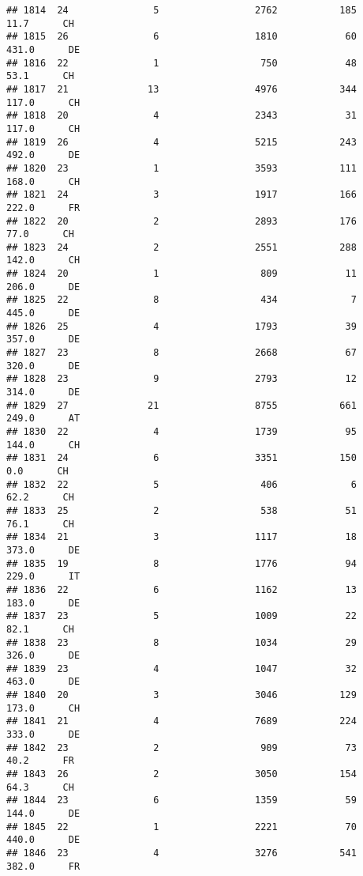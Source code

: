 \documentclass[
]{article}
\begin{document}
\begin{verbatim}
## 1814  24               5                 2762           185     11.7      CH
## 1815  26               6                 1810            60    431.0      DE
## 1816  22               1                  750            48     53.1      CH
## 1817  21              13                 4976           344    117.0      CH
## 1818  20               4                 2343            31    117.0      CH
## 1819  26               4                 5215           243    492.0      DE
## 1820  23               1                 3593           111    168.0      CH
## 1821  24               3                 1917           166    222.0      FR
## 1822  20               2                 2893           176     77.0      CH
## 1823  24               2                 2551           288    142.0      CH
## 1824  20               1                  809            11    206.0      DE
## 1825  22               8                  434             7    445.0      DE
## 1826  25               4                 1793            39    357.0      DE
## 1827  23               8                 2668            67    320.0      DE
## 1828  23               9                 2793            12    314.0      DE
## 1829  27              21                 8755           661    249.0      AT
## 1830  22               4                 1739            95    144.0      CH
## 1831  24               6                 3351           150      0.0      CH
## 1832  22               5                  406             6     62.2      CH
## 1833  25               2                  538            51     76.1      CH
## 1834  21               3                 1117            18    373.0      DE
## 1835  19               8                 1776            94    229.0      IT
## 1836  22               6                 1162            13    183.0      DE
## 1837  23               5                 1009            22     82.1      CH
## 1838  23               8                 1034            29    326.0      DE
## 1839  23               4                 1047            32    463.0      DE
## 1840  20               3                 3046           129    173.0      CH
## 1841  21               4                 7689           224    333.0      DE
## 1842  23               2                  909            73     40.2      FR
## 1843  26               2                 3050           154     64.3      CH
## 1844  23               6                 1359            59    144.0      DE
## 1845  22               1                 2221            70    440.0      DE
## 1846  23               4                 3276           541    382.0      FR

\end{verbatim}
\end{document}
